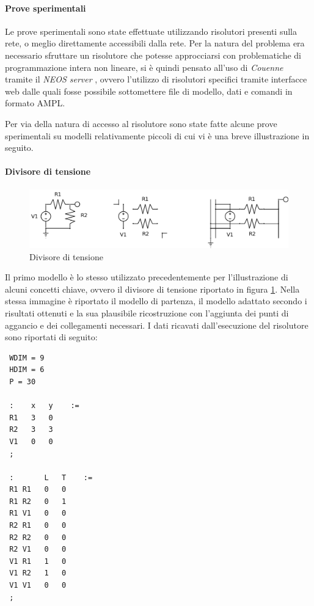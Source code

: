 \paragraph{Prove sperimentali}
Le prove sperimentali sono state effettuate utilizzando risolutori presenti sulla rete, o meglio direttamente accessibili dalla rete. Per la natura del problema era necessario sfruttare un risolutore che potesse approcciarsi con problematiche di programmazione intera non lineare, si è quindi pensato all'uso di \textit{Couenne} \cite{couenne} tramite il \textit{NEOS server} \cite{neos}\cite{neosserver}, ovvero l'utilizzo di risolutori specifici tramite interfacce web dalle quali fosse possibile sottomettere file di modello, dati e comandi in formato AMPL.

Per via della natura di accesso al risolutore sono state fatte alcune prove sperimentali su modelli relativamente piccoli di cui vi è una breve illustrazione in seguito.

\paragraph{Divisore di tensione}
\begin{figure}[ht]
 \centering
 \includegraphics[scale=0.5]{immagini/voltage_divider.pdf}
 \caption{Divisore di tensione}
 \label{voltagedivider}
\end{figure}
Il primo modello è lo stesso utilizzato precedentemente per l'illustrazione di alcuni concetti chiave, ovvero il divisore di tensione riportato in figura \ref{voltagedivider}. Nella stessa immagine è riportato il modello di partenza, il modello adattato secondo i risultati ottenuti e la sua plausibile ricostruzione con l'aggiunta dei punti di aggancio e dei collegamenti necessari. I dati ricavati dall'esecuzione del risolutore sono riportati di seguito:
\small
\begin{verbatim}
 WDIM = 9
 HDIM = 6
 P = 30

 :    x   y    :=
 R1   3   0
 R2   3   3
 V1   0   0
 ;

 :       L   T    :=
 R1 R1   0   0
 R1 R2   0   1
 R1 V1   0   0
 R2 R1   0   0
 R2 R2   0   0
 R2 V1   0   0
 V1 R1   1   0
 V1 R2   1   0
 V1 V1   0   0
 ;
\end{verbatim}
\normalsize


